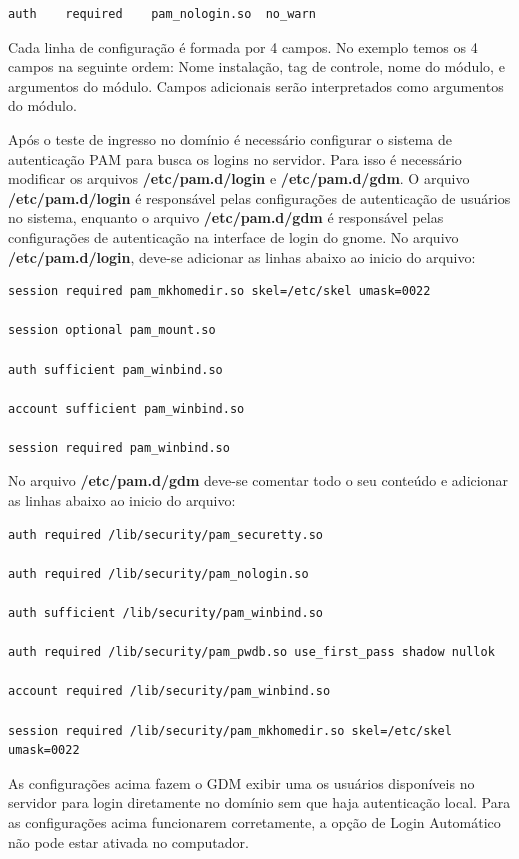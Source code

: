 \begin{lstlisting}	
auth	required	pam_nologin.so	no_warn
\end{lstlisting}

Cada linha de configuração é formada por 4 campos. No exemplo temos os 4 campos na seguinte ordem: Nome instalação, tag de controle, nome do módulo, e argumentos do módulo. Campos adicionais serão interpretados como argumentos do módulo.

Após o teste de ingresso no domínio é necessário configurar o sistema de autenticação PAM para busca os logins no servidor. Para isso é necessário modificar os arquivos \textbf{/etc/pam.d/login} e \textbf{/etc/pam.d/gdm}. O arquivo \textbf{/etc/pam.d/login} é responsável pelas configurações de autenticação de usuários no sistema, enquanto o arquivo \textbf{/etc/pam.d/gdm} é responsável pelas configurações de autenticação na interface de login do gnome.
No arquivo \textbf{/etc/pam.d/login}, deve-se adicionar as linhas abaixo ao inicio do arquivo:\\

\begin{lstlisting}
session required pam_mkhomedir.so skel=/etc/skel umask=0022

session optional pam_mount.so

auth sufficient pam_winbind.so

account sufficient pam_winbind.so

session required pam_winbind.so
\end{lstlisting}

No arquivo \textbf{/etc/pam.d/gdm} deve-se comentar todo o seu conteúdo e adicionar as linhas abaixo ao inicio do arquivo:\\

\begin{lstlisting}	
auth required /lib/security/pam_securetty.so

auth required /lib/security/pam_nologin.so

auth sufficient /lib/security/pam_winbind.so

auth required /lib/security/pam_pwdb.so use_first_pass shadow nullok

account required /lib/security/pam_winbind.so

session required /lib/security/pam_mkhomedir.so skel=/etc/skel umask=0022
\end{lstlisting}

As configurações acima fazem o GDM exibir uma os usuários disponíveis no servidor para login diretamente no domínio sem que haja autenticação local. Para as configurações acima funcionarem corretamente, a opção de Login Automático não pode estar ativada no computador. 